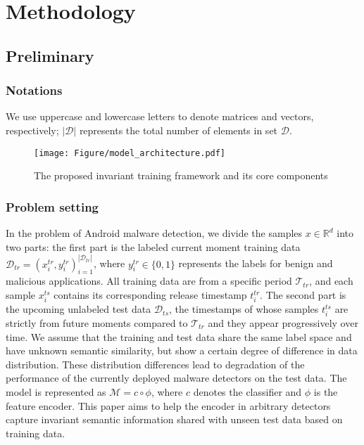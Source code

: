 \section{Methodology}

\subsection{Preliminary}
\subsubsection{Notations}
We use uppercase and lowercase letters to denote matrices and vectors, respectively; $|\mathcal{D}|$ represents the total number of elements in set $\mathcal{D}$. 

\begin{figure*}
    \centering
    \texttt{[image: Figure/model\_architecture.pdf]}
    \caption{The proposed invariant training framework and its core components}
    \label{fig:model_architecture}
\end{figure*}

\subsubsection{Problem setting}
In the problem of Android malware detection, we divide the samples $x \in \mathbb{R}^{d}$ into two parts: the first part is the labeled current moment training data $\mathcal{D}_{tr} = {(x_i^{tr},y_i^{tr})}^{|\mathcal{D}_{tr }|}_{i=1}$, where $y_{i}^{tr} \in \{0, 1\}$ represents the labels for benign and malicious applications. All training data are from a specific period $\mathcal{T}_{tr}$, and each sample $x_i^{ts}$ contains its corresponding release timestamp $t_i^{tr}$. The second part is the upcoming unlabeled test data $\mathcal{D}_{ts}$, the timestamps of whose samples $t_i^{ts}$ are strictly from future moments compared to $\mathcal{T}_{tr}$ and they appear progressively over time. We assume that the training and test data share the same label space and have unknown semantic similarity, but show a certain degree of difference in data distribution. These distribution differences lead to degradation of the performance of the currently deployed malware detectors on the test data. The model is represented as $\mathcal{M} = c \circ \phi$, where $c$ denotes the classifier and $\phi$ is the feature encoder. This paper aims to help the encoder in arbitrary detectors capture invariant semantic information shared with unseen test data based on training data. 




